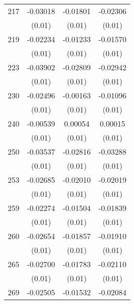 \begin{table}[htbp]
\begin{tabular}{l*{3}{c}}
217                 &    -0.03018\sym{**} &    -0.01801         &    -0.02306\sym{*}  \\
                    &      (0.01)         &      (0.01)         &      (0.01)         \\
219                 &    -0.02234\sym{**} &    -0.01233         &    -0.01570\sym{*}  \\
                    &      (0.01)         &      (0.01)         &      (0.01)         \\
223                 &    -0.03902\sym{***}&    -0.02809\sym{*}  &    -0.02942\sym{**} \\
                    &      (0.01)         &      (0.01)         &      (0.01)         \\
230                 &    -0.02496\sym{***}&    -0.00163         &    -0.01096         \\
                    &      (0.01)         &      (0.01)         &      (0.01)         \\
240                 &    -0.00539         &     0.00054         &     0.00015         \\
                    &      (0.01)         &      (0.01)         &      (0.01)         \\
250                 &    -0.03537\sym{***}&    -0.02816\sym{**} &    -0.03288\sym{***}\\
                    &      (0.01)         &      (0.01)         &      (0.01)         \\
253                 &    -0.02685\sym{***}&    -0.02010\sym{**} &    -0.02019\sym{**} \\
                    &      (0.01)         &      (0.01)         &      (0.01)         \\
259                 &    -0.02274\sym{**} &    -0.01504\sym{*}  &    -0.01839\sym{*}  \\
                    &      (0.01)         &      (0.01)         &      (0.01)         \\
260                 &    -0.02654\sym{*}  &    -0.01857         &    -0.01910         \\
                    &      (0.01)         &      (0.01)         &      (0.01)         \\
265                 &    -0.02700\sym{***}&    -0.01783\sym{**} &    -0.02110\sym{***}\\
                    &      (0.01)         &      (0.01)         &      (0.01)         \\
269                 &    -0.02505\sym{**} &    -0.01532         &    -0.02084\sym{*}  \\

\end{tabular}
\end{table}
